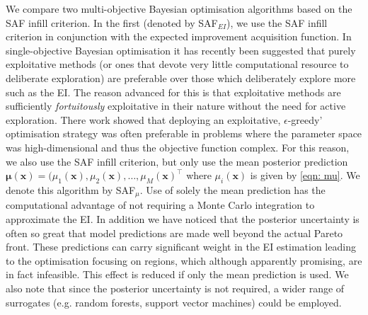 \documentclass[conference]{IEEEtran}
\makeatletter
\newcommand{\nobj}{M}
\newcommand\safmu{SAF$_{\mu}$\xspace}
\newcommand\safei{SAF$_{EI}$\xspace}
\newcommand\ei{EI\xspace}
\newcommand{\trp}{^\top}
\newcommand{\bx}{\mathbf{x}}
\newcommand{\bmu}{\boldsymbol{\mu}}
\newcommand*{\eg}{e.g.\@\xspace}
\makeatother
\begin{document}
We compare two multi-objective Bayesian optimisation algorithms based on the SAF infill criterion.  In the first (denoted by \safei), we use the SAF infill criterion in conjunction with the expected improvement acquisition function.  
In single-objective Bayesian optimisation it has recently been suggested that purely exploitative  methods (or ones that devote very little computational resource to deliberate exploration) are preferable over those which deliberately explore more such as the \ei \cite{death2019greed}. The reason advanced for this is that exploitative methods are sufficiently \textit{fortuitously} exploitative in their nature without the need for active exploration. There work showed that deploying an exploitative, $\epsilon$-greedy' optimisation strategy was often preferable in problems where the parameter space was high-dimensional and thus the objective function complex.  For this reason, we also use the SAF infill criterion, but only use the mean posterior prediction $\bmu(\bx) = (\mu_1(\bx), \mu_2(\bx),\ldots, \mu_\nobj(\bx)\trp$ where $\mu_i(\bx)$ is given by \eqref{eqn: mu}.  We denote this algorithm by \safmu.   Use of solely the mean prediction has the computational advantage of not requiring a Monte Carlo integration to approximate the \ei. In addition we have noticed that the posterior uncertainty is often so great that model predictions are made well beyond the actual Pareto front. These predictions can carry significant weight in the \ei estimation leading to the optimisation focusing on regions, which although apparently promising, are in fact infeasible.  This effect is reduced if only the mean prediction is used.  We also note that since the posterior uncertainty is not required, a wider range of surrogates (\eg random forests, support vector machines) could be employed. 

\end{document}
